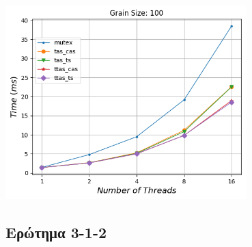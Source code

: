 \begin{minipage}{\textwidth}
   \begin{center}
      \\
      \vspace{3mm}
      \includegraphics[width=0.7\textwidth, frame]{./graphs/time/grain-100.png}
      \vspace{6mm}
   \end{center}
\end{minipage}

\subsection{Ερώτημα 3-1-2}